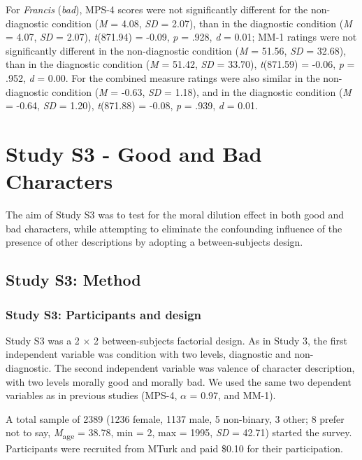 \documentclass[
  man,floatsintext]{apa6}
\begin{document}
For \emph{Francis} (\emph{bad}), MPS-4 scores were not significantly different for the non-diagnostic condition (\emph{M} = 4.08, \emph{SD} = 2.07), than in the diagnostic condition (\emph{M} = 4.07, \emph{SD} = 2.07), \emph{t}(871.94) = -0.09, \emph{p} = .928, \emph{d} = 0.01; MM-1 ratings were not significantly different in the non-diagnostic condition (\emph{M} = 51.56, \emph{SD} = 32.68), than in the diagnostic condition (\emph{M} = 51.42, \emph{SD} = 33.70), \emph{t}(871.59) = -0.06, \emph{p} = .952, \emph{d} = 0.00. For the combined measure ratings were also similar in the non-diagnostic condition (\emph{M} = -0.63, \emph{SD} = 1.18), and in the diagnostic condition (\emph{M} = -0.64, \emph{SD} = 1.20), \emph{t}(871.88) = -0.08, \emph{p} = .939, \emph{d} = 0.01.

\pagebreak

\section{Study S3 - Good and Bad Characters}\label{study-s3---good-and-bad-characters}

The aim of Study S3 was to test for the moral dilution effect in both good and bad characters, while attempting to eliminate the confounding influence of the presence of other descriptions by adopting a between-subjects design.

\subsection{Study S3: Method}\label{study-s3-method}

\subsubsection{Study S3: Participants and design}\label{study-s3-participants-and-design}

Study S3 was a 2 \(\times\) 2 between-subjects factorial design. As in Study 3, the first independent variable was condition with two levels, diagnostic and non-diagnostic. The second independent variable was valence of character description, with two levels morally good and morally bad. We used the same two dependent variables as in previous studies (MPS-4, \(\alpha\) = 0.97, and MM-1).

A total sample of 2389 (1236 female, 1137 male, 5 non-binary, 3 other; 8 prefer not to say, \emph{M}\textsubscript{age} = 38.78, min = 2, max = 1995, \emph{SD} = 42.71) started the survey. Participants were recruited from MTurk and paid \$0.10 for their participation.
\end{document}
